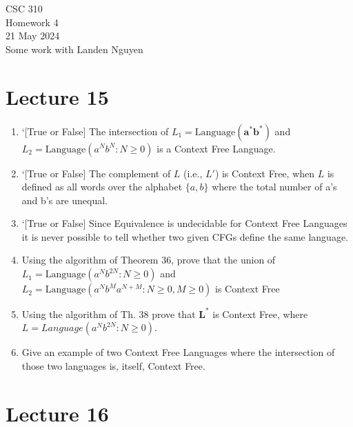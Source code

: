 \documentclass[letterpaper, 12 pt]{article}
\newcommand{\Language}{\mathrm{Language}}
\begin{document}
\begin{center}
    \Large CSC 310 \\
    Homework 4     \\
    \normalsize
    21 May 2024    \\

    Some work with Landen Nguyen
\end{center}

\section{Lecture 15}

\begin{enumerate}
    \item \char`[True or False] The intersection of
        $L_1=\text{Language}(\bm{a^*b^*})$ and $L_2=\Language(a^Nb^N: N \geq
        0)$ is a Context Free Language.

    \item \char`[True or False] The complement of $L$ (i.e., $L'$) is Context Free, when $L$ is
        defined as all words over the alphabet $\{a, b\}$ where the total number
        of a's and b's are unequal.

    \item \char`[True or False] Since Equivalence is undecidable for Context
        Free Languages it is never possible to tell whether two given CFGs
        define the same language.

    \item Using the algorithm of Theorem 36, prove that the union of $L_1 =
        \Language(a^Nb^{2N}: N \geq 0)$ and $L_2 = \Language(a^Nb^Ma^{N+M} : N
        \geq 0, M \geq 0)$ is Context Free

    \item Using the algorithm of Th. 38 prove that $\bm{L^*}$ is Context Free,
        where $L = Language(a^Nb^{2N}: N \geq 0)$.

    \item Give an example of two Context Free Languages where the intersection
        of those two languages is, itself, Context Free.

\end{enumerate}

\section{Lecture 16}
\end{document}
